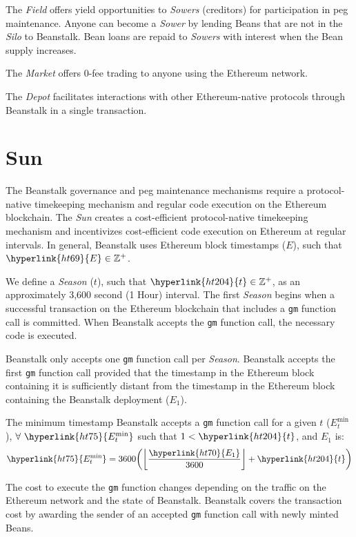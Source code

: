 \documentclass[tikz]{article}
\newcommand{\code}[1]{\texttt{#1}}
\newcommand{\term}[1]{\textsl{#1}}
\begin{document}
The \term{Field} offers yield opportunities to \term{Sowers} (creditors) for participation in peg maintenance. Anyone can become a \term{Sower} by lending Beans that are not in the \term{Silo} to Beanstalk. Bean loans are repaid to \term{Sowers} with interest when the Bean supply increases. 

The \term{Market} offers 0-fee trading to anyone using the Ethereum network.

The \term{Depot} facilitates interactions with other Ethereum-native protocols through Beanstalk in a single transaction.

\section{Sun}
The Beanstalk governance and peg maintenance mechanisms require a protocol-native timekeeping mechanism and regular code execution on the Ethereum blockchain. The \term{Sun} creates a cost-efficient protocol-native timekeeping mechanism and incentivizes cost-efficient code execution on Ethereum at regular intervals. In general, Beanstalk uses Ethereum block timestamps (\hyperlink{ht69}{$E$}), such that $\hyperlink{ht69}{E} \in \mathbb{Z}^{+}$.

We define a \term{Season} (\hyperlink{ht204}{$t$}), such that $\hyperlink{ht204}{t} \in \mathbb{Z}^{+}$, as an approximately 3,600 second (1 Hour) interval. The first \term{Season} begins when a successful transaction on the Ethereum blockchain that includes a \code{gm} function call is committed. When Beanstalk accepts the \code{gm} function call, the necessary code is executed.

Beanstalk only accepts one \code{gm} function call per \term{Season}. Beanstalk accepts the first \code{gm} function call provided that the timestamp in the Ethereum block containing it is sufficiently distant from the timestamp in the Ethereum block containing the Beanstalk deployment (\hyperlink{ht70}{$E_1$}).

The minimum timestamp Beanstalk accepts a \code{gm} function call for a given \hyperlink{ht204}{$t$} (\hyperlink{ht75}{$E_{t}^{\text{min}}$}), $\forall\ \hyperlink{ht75}{E_{t}^{\text{min}}}$ such that $1 < \hyperlink{ht204}{t}$, and \hyperlink{ht70}{$E_1$} is:
$$\hyperlink{ht75}{E_{t}^{\text{min}}} = 3600{\left({\left\lfloor\frac{\hyperlink{ht70}{E_1}}{3600}\right\rfloor} + \hyperlink{ht204}{t}\right)}$$

The cost to execute the \code{gm} function changes depending on the traffic on the Ethereum network and the state of Beanstalk. Beanstalk covers the transaction cost by awarding the sender of an accepted \code{gm} function call with newly minted Beans. 
\end{document}
